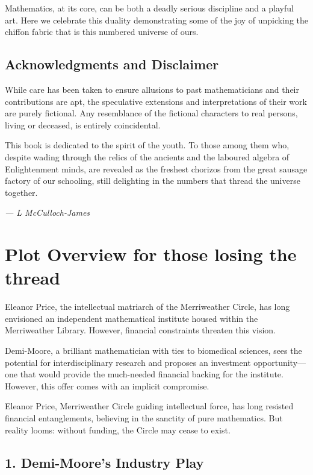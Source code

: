 Mathematics, at its core, can be both a deadly serious discipline and a playful art. Here we celebrate this duality demonstrating some of the joy of unpicking the chiffon fabric that is this numbered universe of ours.

\subsection*{Acknowledgments and Disclaimer}
While care has been taken to ensure allusions to past mathematicians and their contributions are apt, the speculative extensions and interpretations of their work are purely fictional. Any resemblance of the fictional characters to real persons, living or deceased, is entirely coincidental.

This book is dedicated to the spirit of the youth. To those among them who, despite wading through the relics of the ancients and the laboured algebra of Enlightenment minds, are revealed as the freshest chorizos from the great sausage factory of our schooling, still delighting in the numbers that thread the universe together.
\begin{flushright}
\textit{— L McCulloch-James}
\end{flushright}


\section*{Plot Overview for those losing the thread}

Eleanor Price, the intellectual matriarch of the Merriweather Circle, has long envisioned an independent mathematical institute housed within the Merriweather Library. However, financial constraints threaten this vision.

Demi-Moore, a brilliant mathematician with ties to biomedical sciences, sees the potential for interdisciplinary research and proposes an investment opportunity—one that would provide the much-needed financial backing for the institute. However, this offer comes with an implicit compromise.

Eleanor Price, Merriweather Circle guiding intellectual force, has long resisted financial entanglements, believing in the sanctity of pure mathematics. But reality looms: without funding, the Circle may cease to exist.

\subsection*{1. Demi-Moore’s Industry Play}

